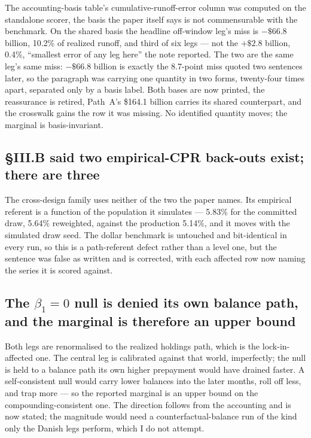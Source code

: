 \documentclass[11pt]{article}
\begin{document}
The accounting-basis table's cumulative-runoff-error column was computed on the
standalone scorer, the basis the paper itself says is not commensurable with the
benchmark. On the shared basis the headline off-window leg's miss is $-\$66.8$ billion,
10.2\% of realized runoff, and third of six legs --- not the $+\$2.8$ billion, 0.4\%,
``smallest error of any leg here'' the note reported. The two are the same leg's same
miss: $-\$66.8$ billion is exactly the 8.7-point miss quoted two sentences later, so the
paragraph was carrying one quantity in two forms, twenty-four times apart, separated only
by a basis label. Both bases are now printed, the reassurance is retired, Path~A's
\$164.1 billion carries its shared counterpart, and the crosswalk gains the row it was
missing. No identified quantity moves; the marginal is basis-invariant.

\subsection{\S III.B said two empirical-CPR back-outs exist; there are three}

The cross-design family uses neither of the two the paper names. Its empirical referent
is a function of the population it simulates --- 5.83\% for the committed draw, 5.64\%
reweighted, against the production 5.14\%, and it moves with the simulated draw seed. The
dollar benchmark is untouched and bit-identical in every run, so this is a path-referent
defect rather than a level one, but the sentence was false as written and is corrected,
with each affected row now naming the series it is scored against.

\subsection{The $\beta_1 = 0$ null is denied its own balance path, and the marginal is
therefore an upper bound}

Both legs are renormalised to the realized holdings path, which is the lock-in-affected
one. The central leg is calibrated against that world, imperfectly; the null is held to a
balance path its own higher prepayment would have drained faster. A self-consistent null
would carry lower balances into the later months, roll off less, and trap more --- so the
reported marginal is an upper bound on the compounding-consistent one. The direction
follows from the accounting and is now stated; the magnitude would need a
counterfactual-balance run of the kind only the Danish legs perform, which I do not
attempt.
\end{document}
